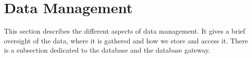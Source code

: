 \section{Data Management}
\label{sec:datamanage}

This section describes the different aspects of data management. It gives a brief oversight of the data, where it is gathered and how we store and access it. There is a subsection dedicated to the database and the database gateway.




